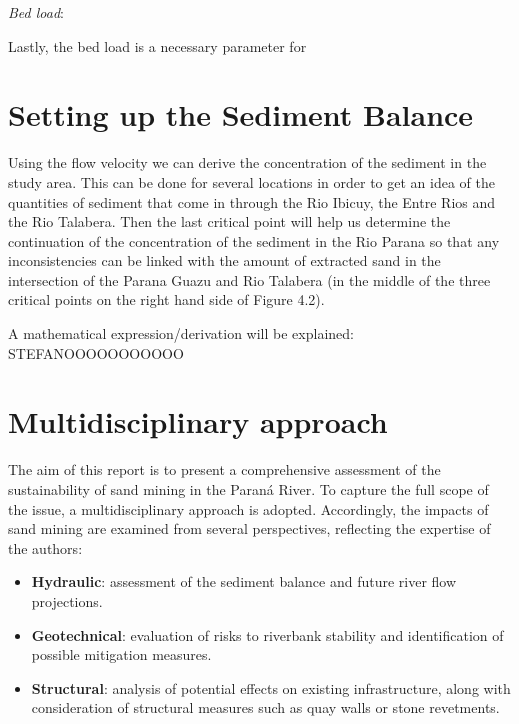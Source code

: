 \textit{Bed load}:

Lastly, the bed load is a necessary parameter for 

\section{Setting up the Sediment Balance}
Using the flow velocity we can derive the concentration of the sediment in the study area. This can be done for several locations in order to get an idea of the quantities of sediment that come in through the Rio Ibicuy, the Entre Rios and the Rio Talabera. Then the last critical point will help us determine the continuation of the concentration of the sediment in the Rio Parana so that any inconsistencies can be linked with the amount of extracted sand in the intersection of the Parana Guazu and Rio Talabera (in the middle of the three critical points on the right hand side of Figure 4.2).

A mathematical expression/derivation will be explained:
STEFANOOOOOOOOOOO

\section{Multidisciplinary approach}
The aim of this report is to present a comprehensive assessment of the sustainability of sand mining in the Paraná River. To capture the full scope of the issue, a multidisciplinary approach is adopted. Accordingly, the impacts of sand mining are examined from several perspectives, reflecting the expertise of the authors:

\begin{itemize}
    \item \textbf{Hydraulic}: assessment of the sediment balance and future river flow projections.
    \item \textbf{Geotechnical}: evaluation of risks to riverbank stability and identification of possible mitigation measures.
    \item \textbf{Structural}: analysis of potential effects on existing infrastructure, along with consideration of structural measures such as quay walls or stone revetments.
\end{itemize}